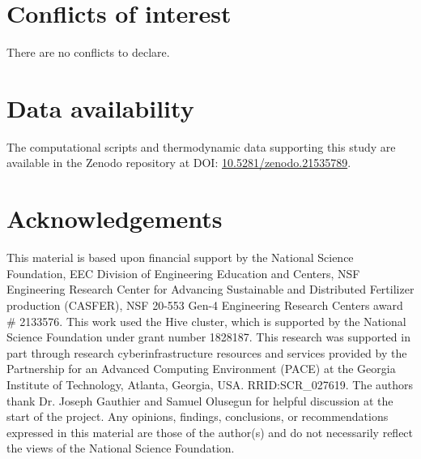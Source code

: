 \documentclass[twoside,twocolumn,9pt]{article}
\renewcommand{\refname}{Notes and references}
\begin{document}
\section*{Conflicts of interest}
There are no conflicts to declare.

\section*{Data availability}
The computational scripts and thermodynamic data supporting this study are available in the Zenodo repository at DOI: \href{https://doi.org/10.5281/zenodo.21535789}{10.5281/zenodo.21535789}.




\section*{Acknowledgements}
This material is based upon financial support by the National Science Foundation, EEC Division of Engineering Education and Centers, NSF Engineering Research Center for Advancing Sustainable and Distributed Fertilizer production (CASFER), NSF 20-553 Gen-4 Engineering Research Centers award \# 2133576. This work used the Hive cluster, which is supported by the National Science Foundation under grant number 1828187.  This research was supported in part through research cyberinfrastructure resources and services provided by the Partnership for an Advanced Computing Environment (PACE) at the Georgia Institute of Technology, Atlanta, Georgia, USA. RRID:SCR\_027619. The authors thank Dr. Joseph Gauthier and Samuel Olusegun for helpful discussion at the start of the project. Any opinions, findings, conclusions, or recommendations expressed in this material are those of the author(s) and do not necessarily reflect the views of the National Science Foundation. 



\balance



\clearpage
% 
\end{document}
